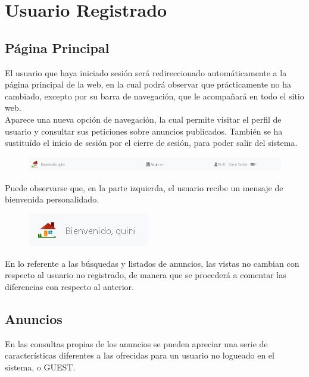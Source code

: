 \section{Usuario Registrado}

\subsection{P\'{a}gina Principal}
El usuario que haya iniciado sesi\'{o}n ser\'{a} redireccionado autom\'{a}ticamente a la p\'{a}gina principal de la web, en la cual podr\'{a} observar que pr\'{a}cticamente no ha cambiado, excepto por su barra de navegaci\'{o}n, que le acompa\~{n}ar\'{a} en todo el sitio web. \\

Aparece una nueva opci\'{o}n de navegaci\'{o}n, la cual permite visitar el perfil de usuario y consultar sus peticiones sobre anuncios publicados. Tambi\'{e}n se ha sustitu\'{i}do el inicio de sesi\'{o}n por el cierre de sesi\'{o}n, para poder salir del sistema.

\begin{figure}[h!]
\centering
\includegraphics[width=1\textwidth]{Img/ManualUsuario/USER_MENU.png}
\end{figure}

Puede observarse que, en la parte izquierda, el usuario recibe un mensaje de bienvenida personalidado.

\begin{figure}[h!]
\centering
\includegraphics[width=.5\textwidth]{Img/ManualUsuario/USER_MENU_SALUDO.png}
\end{figure}

En lo referente a las b\'{u}squedas y listados de anuncios, las vistas no cambian con respecto al usuario no registrado, de manera que se proceder\'{a} a comentar las diferencias con respecto al anterior.

\subsection{Anuncios}
En las consultas propias de los anuncios se pueden apreciar una serie de caracter\'{i}sticas diferentes a las ofrecidas para un usuario no logueado en el sistema, o GUEST.\\

